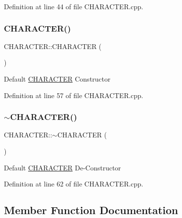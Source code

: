 Definition at line 44 of file C\+H\+A\+R\+A\+C\+T\+E\+R.\+cpp.

\mbox{\label{class_c_h_a_r_a_c_t_e_r_af8c0944af8935d153e26ec9e4aa17990}} 
\subsubsection{\texorpdfstring{CHARACTER()}{CHARACTER()}\hspace{0.1cm}{\footnotesize\ttfamily [4/4]}}
{\footnotesize\ttfamily C\+H\+A\+R\+A\+C\+T\+E\+R\+::\+C\+H\+A\+R\+A\+C\+T\+ER (\begin{DoxyParamCaption}{ }\end{DoxyParamCaption})}



Default \mbox{\hyperlink{class_c_h_a_r_a_c_t_e_r}{C\+H\+A\+R\+A\+C\+T\+ER}} Constructor 



Definition at line 57 of file C\+H\+A\+R\+A\+C\+T\+E\+R.\+cpp.

\mbox{\label{class_c_h_a_r_a_c_t_e_r_a46eff965f189ed1c4d61f9f04c93da5d}} 
\subsubsection{\texorpdfstring{$\sim$CHARACTER()}{~CHARACTER()}}
{\footnotesize\ttfamily C\+H\+A\+R\+A\+C\+T\+E\+R\+::$\sim$\+C\+H\+A\+R\+A\+C\+T\+ER (\begin{DoxyParamCaption}{ }\end{DoxyParamCaption})}



Default \mbox{\hyperlink{class_c_h_a_r_a_c_t_e_r}{C\+H\+A\+R\+A\+C\+T\+ER}} De-\/\+Constructor 



Definition at line 62 of file C\+H\+A\+R\+A\+C\+T\+E\+R.\+cpp.



\subsection{Member Function Documentation}
\mbox{\label{class_c_h_a_r_a_c_t_e_r_a49b688dd97468943d50a34c68b1a21e9}} 
